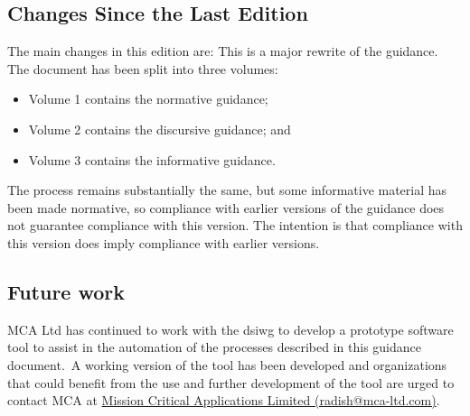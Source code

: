 \subsection*{Changes Since the Last Edition}%
\cbstart The main changes in this edition are:
This is a major rewrite of the guidance. The document has been split into three volumes:
\begin{itemize}
	\item Volume 1 contains the normative guidance;
	\item Volume 2 contains the discursive guidance; and
	\item Volume 3 contains the informative guidance.
\end{itemize}
The process remains substantially the same, but some informative material has been made normative, so compliance with earlier versions of the guidance does not guarantee compliance with this version. The intention is that compliance with this version does imply compliance with earlier versions.
\subsection*{Future work}

MCA Ltd has continued to work with the \gls{dsiwg} to develop a prototype software tool to assist in the automation of the processes described in this guidance document.\cbend\
A working version of the tool has been developed and organizations that could benefit from the use and further development of the tool are urged to contact MCA at \href{mailto:radish@mca-ltd.com}{Mission Critical Applications Limited (radish@mca-ltd.com)}.

